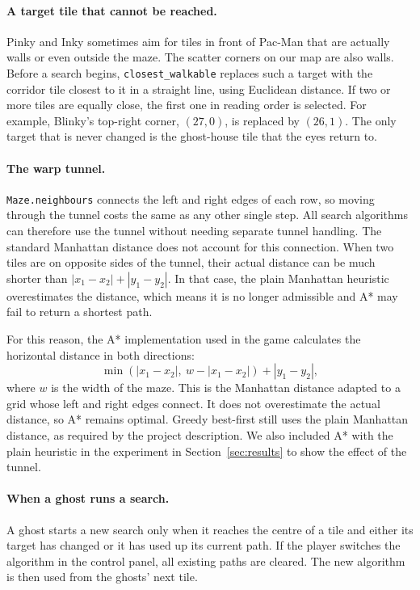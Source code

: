 \documentclass[12pt,a4paper]{article}
\begin{document}
\paragraph{A target tile that cannot be reached.} Pinky and Inky sometimes aim for tiles in front of Pac-Man that are actually walls or even outside the maze. The scatter corners on our map are also walls. Before a search begins, \texttt{closest\_walkable} replaces such a target with the corridor tile closest to it in a straight line, using Euclidean distance. If two or more tiles are equally close, the first one in reading order is selected. For example, Blinky's top-right corner, $(27,0)$, is replaced by $(26,1)$. The only target that is never changed is the ghost-house tile that the eyes return to.

\paragraph{The warp tunnel.} \texttt{Maze.neighbours} connects the left and right edges of each row, so moving through the tunnel costs the same as any other single step. All search algorithms can therefore use the tunnel without needing separate tunnel handling. The standard Manhattan distance does not account for this connection. When two tiles are on opposite sides of the tunnel, their actual distance can be much shorter than $|x_1-x_2|+|y_1-y_2|$. In that case, the plain Manhattan heuristic overestimates the distance, which means it is no longer admissible and A* may fail to return a shortest path.

For this reason, the A* implementation used in the game calculates the horizontal distance in both directions:
\[
  \min(|x_1-x_2|,\ w-|x_1-x_2|) + |y_1-y_2|,
\]
where $w$ is the width of the maze. This is the Manhattan distance adapted to a grid whose left and right edges connect. It does not overestimate the actual distance, so A* remains optimal. Greedy best-first still uses the plain Manhattan distance, as required by the project description. We also included A* with the plain heuristic in the experiment in Section~\ref{sec:results} to show the effect of the tunnel.

\paragraph{When a ghost runs a search.} A ghost starts a new search only when it reaches the centre of a tile and either its target has changed or it has used up its current path. If the player switches the algorithm in the control panel, all existing paths are cleared. The new algorithm is then used from the ghosts' next tile.
\end{document}
